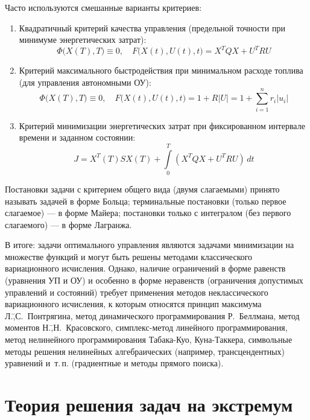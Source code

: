 \documentclass[preprint,russian,a5paper,10pt,twoside]{ncc}
\begin{document}
Часто используются смешанные варианты критериев:
\begin{enumerate}[resume]
\item Квадратичный критерий качества управления (предельной точности при минимуме энергетических затрат):
\[ \Phi \bigl( X(T), T \bigr) \equiv 0, \quad F \bigl( X(t), U(t), t \bigr) = X^TQX + U^TRU \]
\item Критерий максимального быстродействия при минимальном расходе топлива (для управления автономными ОУ):
\[ \Phi \bigl( X(T), T \bigr) \equiv 0, \quad F \bigl( X(t), U(t), t \bigr) = 1 + R\left|U\right| = 1 + \sum\limits_{i=1}^{n}{ r_i \left| u_i \right| } \]
\item Критерий минимизации энергетических затрат при фиксированном интервале времени и заданном состоянии: 
\[ J = X^T \left( T \right) S X \left( T \right) + \int\limits_0^T \left( X^TQX + U^TRU \right) \, dt \] 
\end{enumerate}

Постановки задачи с критерием общего вида (двумя слагаемыми) принято называть задачей в форме Больца; терминальные постановки (только первое слагаемое) --- в форме Майера; постановки только с интегралом (без первого слагаемого) --- в форме Лагранжа.

В итоге: задачи оптимального управления являются задачами минимизации на множестве функций и могут быть решены методами классического вариационного исчисления. Однако, наличие ограничений в форме равенств (уравнения УП и ОУ) и особенно в форме неравенств (ограничения допустимых управлений и состояний) требует применения методов неклассического вариационного исчисления, к которым относятся принцип максимума Л.\=,С.~Понтрягина, метод динамического программирования Р.~Беллмана, метод моментов Н.\=,Н.~Красовского, симплекс-метод линейного программирования, метод нелинейного программирования Табака-Куо, Куна-Таккера, символьные методы решения нелинейных алгебраических (например, трансцендентных) уравнений и~т.\,п. (градиентные и методы прямого поиска).





\clearpage
\section{Теория решения задач на экстремум\label{extremum}}
\end{document}
